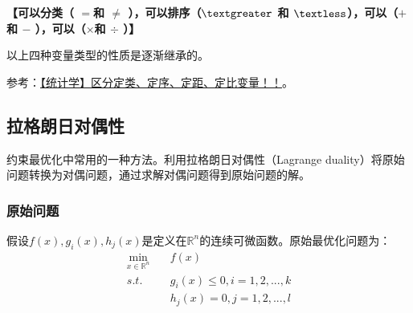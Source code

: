 \textbf{【可以分类（ $=$和 $\neq$ ），可以排序（$\textgreater$ 和 $\textless$），可以（$+$ 和 $-$ ），可以（$\times$和 $\div$ ）】}

以上四种变量类型的性质是逐渐继承的。

参考：\href{https://blog.csdn.net/YYIverson/article/details/100068865}{【统计学】区分定类、定序、定距、定比变量！！}。

\subsection{拉格朗日对偶性}
约束最优化中常用的一种方法。利用拉格朗日对偶性（Lagrange duality）将原始问题转换为对偶问题，通过求解对偶问题得到原始问题的解。

\subsubsection{原始问题}假设$f(x), g_i(x), h_j(x)$是定义在$\mathbb{R}^n$的连续可微函数。原始最优化问题为：
\begin{align}
	\mathop{min}_{x \in \mathbb{R}^n}&\quad f(x) \nonumber \\
	s.t.&\quad g_i(x) \leqslant 0, i = 1, 2, ..., k \nonumber \\
		&\quad h_j(x) = 0, j = 1, 2, ..., l \nonumber
\end{align}

